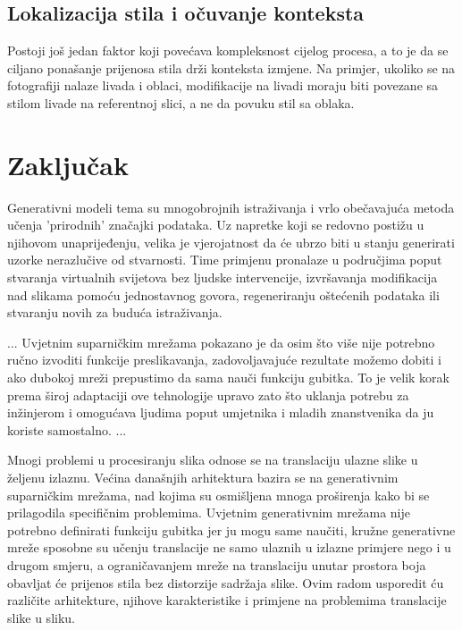 \documentclass[lmodern, utf8, seminar]{fer}
\begin{document}
\section{Lokalizacija stila i očuvanje konteksta} \cite{luan2017deep}
Postoji još jedan faktor koji povećava kompleksnost cijelog procesa, a to je da se ciljano ponašanje prijenosa stila drži konteksta izmjene. Na primjer, ukoliko se na fotografiji nalaze livada i oblaci, modifikacije na livadi moraju biti povezane sa stilom livade na referentnoj slici, a ne da povuku stil sa oblaka. 



\chapter{Zaključak}
Generativni modeli tema su mnogobrojnih istraživanja i vrlo obečavajuća metoda učenja 'prirodnih' značajki podataka. Uz napretke koji se redovno postižu u njihovom unaprijeđenju, velika je vjerojatnost da će ubrzo biti u stanju generirati uzorke nerazlučive od stvarnosti. Time primjenu pronalaze u područjima poput stvaranja virtualnih svijetova bez ljudske intervencije, izvršavanja modifikacija nad slikama pomoću jednostavnog govora, regeneriranju oštećenih podataka ili stvaranju novih za buduća istraživanja.
\newline

...
Uvjetnim suparničkim mrežama pokazano je da osim što više nije potrebno ručno izvoditi funkcije preslikavanja, zadovoljavajuće rezultate možemo dobiti i ako dubokoj mreži prepustimo da sama nauči funkciju gubitka. To je velik korak prema široj adaptaciji ove tehnologije upravo zato što uklanja potrebu za inžinjerom i omogućava ljudima poput umjetnika i mladih znanstvenika da ju koriste samostalno.
...
\newline





\begin{sazetak}
Mnogi problemi u procesiranju slika odnose se na translaciju ulazne slike u željenu izlaznu. Većina današnjih arhitektura bazira se na generativnim suparničkim mrežama, nad kojima su osmišljena mnoga proširenja kako bi se prilagodila specifičnim problemima. Uvjetnim generativnim mrežama nije potrebno definirati funkciju gubitka jer ju mogu same naučiti, kružne generativne mreže sposobne su učenju translacije ne samo ulaznih u izlazne primjere nego i u drugom smjeru, a ograničavanjem mreže na translaciju unutar prostora boja obavljat će prijenos stila bez distorzije sadržaja slike. Ovim radom usporedit ću različite arhitekture, njihove karakteristike i primjene na problemima translacije slike u sliku.

\end{sazetak}

\begin{abstract}

\end{abstract}
\end{document}
